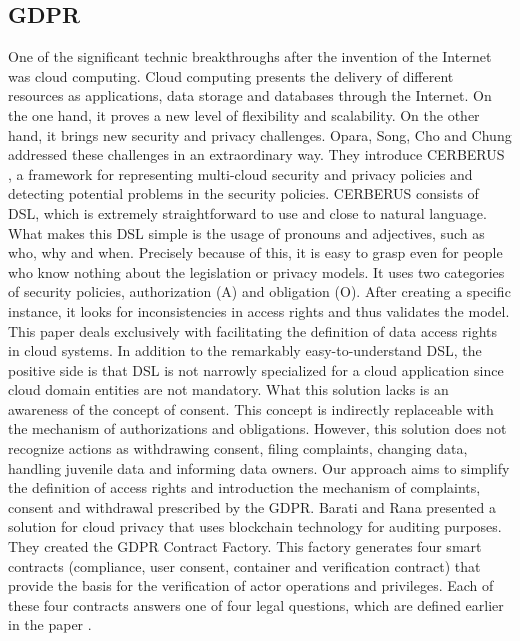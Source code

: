\documentclass[11pt,english]{article}
\begin{document}
\subsection{GDPR}
One of the significant technic breakthroughs after the invention of the Internet was cloud computing. Cloud computing presents the delivery of different resources as applications, data storage and databases through the Internet. On the one hand, it proves a new level of flexibility and scalability. On the other hand, it brings new security and privacy challenges. \newline Opara, Song, Cho and Chung addressed these challenges in an extraordinary way. They introduce CERBERUS \cite{opara2019representing}, a framework for representing multi-cloud security and privacy policies and detecting potential problems in the security policies. CERBERUS consists of DSL, which is extremely straightforward to use and close to natural language. What makes this DSL simple is the usage of pronouns and adjectives, such as who, why and when. Precisely because of this, it is easy to grasp even for people who know nothing about the legislation or privacy models. It uses two categories of security policies, authorization (A) and obligation (O). After creating a specific instance, it looks for inconsistencies in access rights and thus validates the model. This paper deals exclusively with facilitating the definition of data access rights in cloud systems. In addition to the remarkably easy-to-understand DSL, the positive side is that DSL is not narrowly specialized for a cloud application since cloud domain entities are not mandatory. What this solution lacks is an awareness of the concept of consent. This concept is indirectly replaceable with the mechanism of authorizations and obligations. However, this solution does not recognize actions as withdrawing consent, filing complaints, changing data, handling juvenile data and informing data owners. Our approach aims to simplify the definition of access rights and introduction the mechanism of complaints, consent and withdrawal prescribed by the GDPR. Barati and Rana \cite{barati2020tracking} presented a solution for cloud privacy that uses blockchain technology for auditing purposes. They created the GDPR Contract Factory. This factory generates four smart contracts (compliance, user consent, container and veriﬁcation contract) that provide the basis for the veriﬁcation of actor operations and privileges. Each of these four contracts answers one of four legal questions, which are defined earlier in the paper \cite{corrales2018smart}. 
\end{document}
